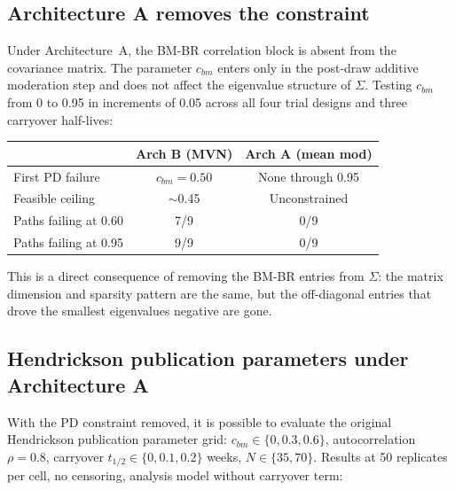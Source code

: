 \documentclass[11pt]{article}
\begin{document}
\subsection{Architecture A removes the constraint}

Under Architecture~A, the BM-BR correlation block is absent
from the covariance matrix. The parameter $c_{bm}$ enters
only in the post-draw additive moderation step and does not
affect the eigenvalue structure of $\Sigma$. Testing
$c_{bm}$ from 0 to 0.95 in increments of 0.05 across all
four trial designs and three carryover half-lives:

\begin{center}
\begin{tabular}{lcc}
\toprule
& \textbf{Arch B (MVN)} & \textbf{Arch A (mean mod)} \\
\midrule
First PD failure & $c_{bm} = 0.50$ & None through 0.95 \\
Feasible ceiling & $\sim$0.45 & Unconstrained \\
Paths failing at 0.60 & 7/9 & 0/9 \\
Paths failing at 0.95 & 9/9 & 0/9 \\
\bottomrule
\end{tabular}
\end{center}

This is a direct consequence of removing the BM-BR entries
from $\Sigma$: the matrix dimension and sparsity pattern are
the same, but the off-diagonal entries that drove the
smallest eigenvalues negative are gone.

\subsection{Hendrickson publication parameters under
  Architecture A}

With the PD constraint removed, it is possible to evaluate the original
Hendrickson publication parameter grid: $c_{bm} \in \{0,
0.3, 0.6\}$, autocorrelation $\rho = 0.8$, carryover
$t_{1/2} \in \{0, 0.1, 0.2\}$ weeks, $N \in \{35, 70\}$.
Results at 50 replicates per cell, no censoring, analysis
model without carryover term:
\end{document}
